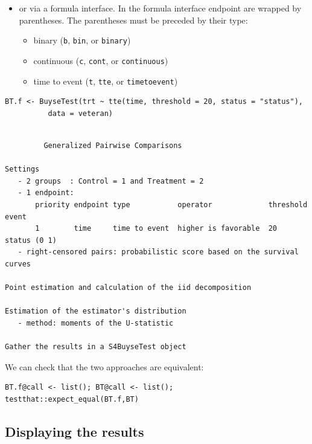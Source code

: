 \documentclass[12pt]{article}
\begin{document}
\clearpage

\begin{itemize}
\item or via a formula interface. In the formula interface endpoint are
wrapped by parentheses. The parentheses must be preceded by their
type: 
\begin{itemize}[label={-}]
\item binary (\texttt{b}, \texttt{bin}, or \texttt{binary})
\item continuous (\texttt{c}, \texttt{cont}, or  \texttt{continuous})
\item time to event (\texttt{t}, \texttt{tte}, or \texttt{timetoevent})
\end{itemize}
\end{itemize}

\lstset{language=r,label= ,caption= ,captionpos=b,numbers=none}
\begin{lstlisting}
BT.f <- BuyseTest(trt ~ tte(time, threshold = 20, status = "status"),
		  data = veteran)
\end{lstlisting}

\begin{verbatim}

         Generalized Pairwise Comparisons

Settings 
   - 2 groups  : Control = 1 and Treatment = 2
   - 1 endpoint: 
       priority endpoint type           operator             threshold event       
       1        time     time to event  higher is favorable  20        status (0 1)
   - right-censored pairs: probabilistic score based on the survival curves 

Point estimation and calculation of the iid decomposition

Estimation of the estimator's distribution 
   - method: moments of the U-statistic

Gather the results in a S4BuyseTest object
\end{verbatim}

We can check that the two approaches are equivalent:
\lstset{language=r,label= ,caption= ,captionpos=b,numbers=none}
\begin{lstlisting}
BT.f@call <- list(); BT@call <- list();
testthat::expect_equal(BT.f,BT)
\end{lstlisting}

\subsection{Displaying the results}
\label{sec:orga55eb2d}
\end{document}
